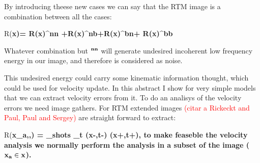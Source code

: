 By introducing theese new cases we can say that the RTM image is a combination between all the cases:

\beq
R(\bf{x})= R(\bf{x})^{nn} +R(\bf{x})^{nb}+R(\bf{x})^{bn}+ R(\bf{x})^{bb}
\eeq

Whatever combination but $\bf^{nn}$ will generate undesired incoherent low frequency energy in our image, and therefore
is considered as noise.

This undesired energy could carry some kinematic information thought,  which could be used for velocity update. In this abstract 
I show for very simple models that we can extract velocity errors from it. To do an analisys of the velocity errors we need image gathers.
 For RTM extended images \textcolor{red}{(citar a Rickeckt and Paul, Paul and Sergey)} are straight forward to extract:

\beq
R(\bf{x_a},\bf{\lambda},\tau) =  \sum_{shots} \sum_t \US(\bf{x}-\bf{\lambda},t-\tau) \UR(\bf{x}+\bf{\lambda},t+\tau),
\eeq
to make feaseble the velocity analysis we normally perform the analysis in a subset of the image ($\bf{x_a} \in \bf{x}$).



